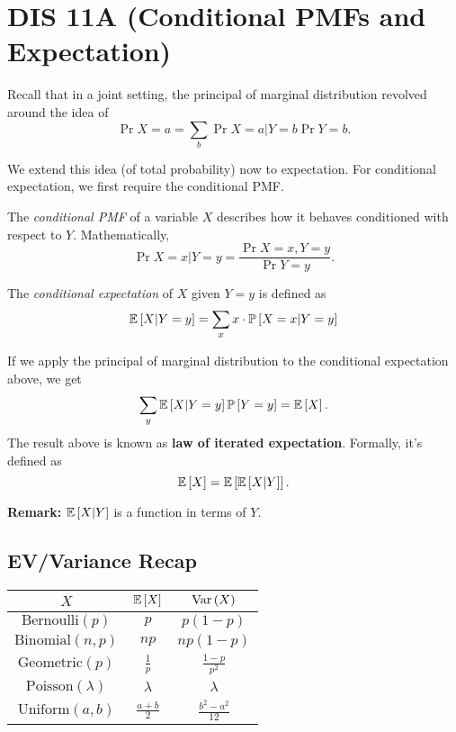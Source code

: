 \section{DIS 11A (Conditional PMFs and Expectation)}

Recall that in a joint setting, the principal of marginal distribution revolved around the idea of \[ \Pr{X = a} = \sum_{b} \Pr{X = a|Y = b} \Pr{Y = b}. \]

We extend this idea (of total probability) now to expectation. For conditional expectation, we first require the conditional PMF. 

\begin{definition}
    The \textit{conditional PMF} of a variable $X$ describes how it behaves conditioned with respect to $Y$. Mathematically, \[ \Pr{X=x|Y=y} = \frac{\Pr{X=x,Y=y}}{\Pr{Y=y}}. \]
\end{definition}

\begin{definition}
    The \textit{conditional expectation} of $X$ given $Y = y$ is defined as \[ \mathbb{E}\left[ X|Y=y \right] = \sum_{x} x \cdot \mathbb{P}\left[ X = x | Y = y \right]\]
\end{definition}

If we apply the principal of marginal distribution to the conditional expectation above, we get \[ \sum_{y} \mathbb{E}\left[ X|Y=y \right]\mathbb{P}\left[ Y=y \right] = \mathbb{E}\left[ X \right]. \]
The result above is known as \textbf{law of iterated expectation}. Formally, it's defined as \[ \mathbb{E}\left[ X \right] = \mathbb{E}\left[ \mathbb{E}\left[ X|Y \right] \right]. \]

\textbf{Remark:} $\mathbb{E}\left[ X|Y \right]$ is a function in terms of $Y$. 

\subsection{EV/Variance Recap}

\begin{center}
    \begin{tabular}{|c|c|c|}
        \hline 
        $X$ & $\mathbb{E}\left[ X \right]$ & $\text{Var}\left( X \right)$ \\
        \hline
        $\text{Bernoulli}(p)$ & $p$ & $p(1-p)$ \\
        \hline
        $\text{Binomial}(n,p)$ & $np$ & $np(1-p)$ \\
        \hline
        $\text{Geometric}(p)$ & $\frac{1}{p}$ & $\frac{1-p}{p^2}$ \\
        \hline
        $\text{Poisson}(\lambda)$ & $\lambda$ & $\lambda$ \\
        \hline
        $\text{Uniform}(a,b)$ & $\frac{a+b}{2}$ & $\frac{b^2-a^2}{12}$ \\
        \hline
    \end{tabular}
\end{center}